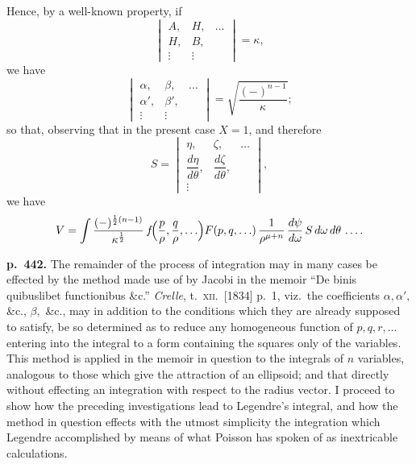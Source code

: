 \documentclass[11pt]{article}
\begin{document}
Hence, by a well-known property, if
\[ \begin{vmatrix} A,&H,&\ldots\\ H,&B,&\\ \vdots&\vdots& \end{vmatrix} = \kappa, \]
we have
\[ \begin{vmatrix} \alpha,&\beta,&\ldots\\ \alpha',&\beta',&\\ \vdots&\vdots& \end{vmatrix} = \sqrt{\frac{(-)^{n-1}}{\kappa}}; \]
so that, observing that in the present case $X = 1$, and therefore
\[ S = \begin{vmatrix} \eta,&\zeta,&\ldots\\[2pt] \dfrac{d\eta}{d\theta},&\dfrac{d\zeta}{d\theta},&\\ \vdots&& \end{vmatrix}, \]
we have
\[ V = \int \frac{(-)^{\frac{1}{2}(n-1)}}{\kappa^{\frac{1}{2}}}\,f\!\Bigl(\frac{p}{\rho},\frac{q}{\rho},\ldots\Bigr)F(p, q, \ldots)\,\frac{1}{\rho^{\mu + n}}\,\frac{d\psi}{d\omega}\,S\,d\omega\,d\theta\,\ldots. \]

\bigskip
\noindent\textbf{p.~442.} The remainder of the process of integration may in many cases be effected by the method made use of by Jacobi in the memoir ``De binis quibuslibet functionibus \&c.'' \textit{Crelle}, t.~\textsc{xii}.\ [1834] p.~1, viz.\ the coefficients $\alpha, \alpha',$ \&c., $\beta,$ \&c., may in addition to the conditions which they are already supposed to satisfy, be so determined as to reduce any homogeneous function of $p, q, r, \ldots$ entering into the integral to a form containing the squares only of the variables. This method is applied in the memoir in question to the integrals of $n$ variables, analogous to those which give the attraction of an ellipsoid; and that directly without effecting an integration with respect to the radius vector. I proceed to show how the preceding investigations lead to Legendre's integral, and how the method in question effects with the utmost simplicity the integration which Legendre accomplished by means of what Poisson has spoken of as inextricable calculations.
\end{document}
